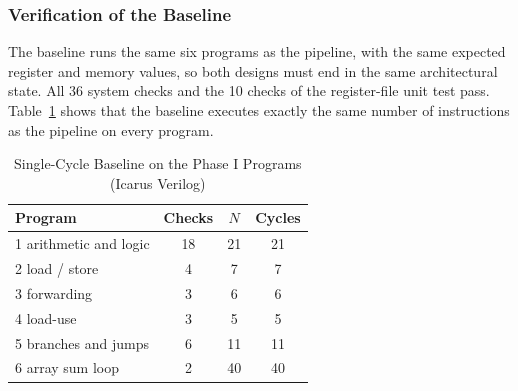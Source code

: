 \subsubsection{Verification of the Baseline}
The baseline runs the same six programs as the pipeline, with the same expected
register and memory values, so both designs must end in the same architectural
state. All 36 system checks and the 10 checks of the register-file unit test
pass. Table~\ref{tab:singlecheck} shows that the baseline executes exactly the
same number of instructions as the pipeline on every program.

\begin{table}[!t]
\centering
\caption{Single-Cycle Baseline on the Phase I Programs (Icarus Verilog)}
\label{tab:singlecheck}
\setlength{\tabcolsep}{5pt}
\renewcommand{\arraystretch}{1.08}
\begin{tabular}{@{}lccc@{}}
\toprule
\textbf{Program} & \textbf{Checks} & \textbf{$N$} & \textbf{Cycles} \\ \midrule
1 arithmetic and logic & 18 & 21 & 21 \\
2 load / store         & 4  & 7  & 7 \\
3 forwarding           & 3  & 6  & 6 \\
4 load-use             & 3  & 5  & 5 \\
5 branches and jumps   & 6  & 11 & 11 \\
6 array sum loop       & 2  & 40 & 40 \\ \bottomrule
\end{tabular}
\end{table}
